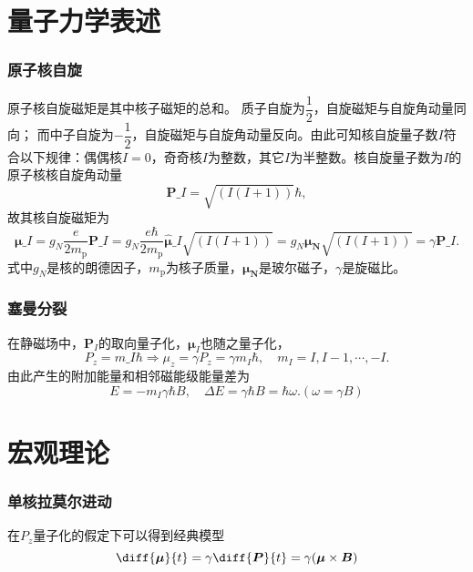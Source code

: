 \section{量子力学表述}
\subsubsection{原子核自旋}
原子核自旋磁矩是其中核子磁矩的总和。
质子自旋为$\dfrac{1}{2}$，自旋磁矩与自旋角动量同向；
而中子自旋为$-\dfrac{1}{2}$，自旋磁矩与自旋角动量反向。由此可知核自旋量子数$I$符合以下规律：偶偶核$I=0$，奇奇核$I$为整数，其它$I$为半整数。核自旋量子数为$I$的原子核核自旋角动量
\begin{equation}
	\boldsymbol{P}\_{I} = \sqrt{(I(I+1))}\hbar,
\end{equation}
故其核自旋磁矩为
\begin{equation}
	\boldsymbol{\mu}\_{I} = g_N\dfrac{e}{2m_{\text{p}}}\boldsymbol{P}\_{I} = g_N\dfrac{e\hbar}{2m_{\text{p}}}\hat{\boldsymbol{\mu}}\_I\sqrt{(I(I+1))} = g_N\boldsymbol{\mu_N}\sqrt{(I(I+1))} = \gamma \boldsymbol{P}\_{I}.
\end{equation}
式中$g_N$是核的朗德因子，$m_{\text{p}}$为核子质量，$\boldsymbol{\mu_N}$是玻尔磁子，$\gamma$是旋磁比。
\subsubsection{塞曼分裂}
在静磁场中，$\boldsymbol{P}_I$的取向量子化，$\boldsymbol{\mu}_I$也随之量子化，
\begin{equation}
	P_z = m\_I\hbar\Rightarrow \mu_z = \gamma P_z=\gamma m_I\hbar,\quad m_I = I,I-1,\cdots,-I.
\end{equation}
由此产生的附加能量和相邻磁能级能量差为
\begin{equation}
	E = -m_I\gamma\hbar B,\quad \Delta E = \gamma\hbar B = \hbar \omega. (\omega = \gamma B)
\end{equation}
\section{宏观理论}
\subsubsection{单核拉莫尔进动}
在$P_z$量子化的假定下可以得到经典模型
\begin{equation}
	\diff{\boldsymbol{\mu}}{t} = \gamma\diff{\boldsymbol{P}}{t} = \gamma (\boldsymbol{\mu}\times \boldsymbol{B})
\end{equation}
